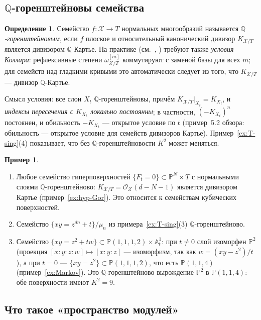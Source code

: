 \documentclass[11pt,a4paper]{article}
\theoremstyle{plain}
\theoremstyle{definition}
\newtheorem{definition}[theorem]{Определение}
\newtheorem{example}[theorem]{Пример}
\theoremstyle{remark}
\newcommand{\Q}{\mathbb{Q}}
\newcommand{\PP}{\mathbb{P}}
\newcommand{\A}{\mathbb{A}}
\newcommand{\cO}{\mathcal{O}}
\newcommand{\cX}{\mathcal{X}}
\begin{document}
\subsection{\texorpdfstring{$\Q$}{Q}-горенштейновы семейства}

\begin{definition}\label{def:QGor-family}
Семейство $f\colon\cX\to T$ нормальных многообразий называется \emph{$\Q$-горенштейновым}, если
$f$ плоское и относительный канонический дивизор $K_{\cX/T}$ является дивизором $\Q$-Картье. На практике
(см.~\cite[\S\,2.5]{Xu}, \cite{Kol23}) требуют также \emph{условия Коллара}: рефлексивные степени
$\omega_{\cX/T}^{[m]}$ коммутируют с заменой базы для всех $m$; для семейств над гладкими кривыми
это автоматически следует из того, что $K_{\cX/T}$ --- дивизор $\Q$-Картье.
\end{definition}

Смысл условия: все слои $X_t$ $\Q$-горенштейновы, причём $K_{\cX/T}|_{X_t}=K_{X_t}$, и
\emph{индексы пересечения с $K_{X_t}$ локально постоянны}; в частности, $(-K_{X_t})^n$ постоянен,
и обильность $-K_{X_t}$ --- открытое условие по $t$ (пример~5.2 обзора: обильность --- открытое
условие для семейств дивизоров Картье). Пример~\ref{ex:T-sing}(4) показывает, что без
$\Q$-горенштейновости $K^2$ может меняться.

\begin{example}
\begin{enumerate}
\item Любое семейство гиперповерхностей $\{F_t=0\}\subset\PP^N\times T$ с нормальными слоями
$\Q$-горенштейново: $K_{\cX/T}=\cO_\cX(d-N-1)$ является дивизором Картье (пример~\ref{ex:hyp-Gor}).
Это относится к семействам кубических поверхностей.
\item Семейство $\{xy=z^{dn}+t\}/\mu_n$ из примера~\ref{ex:T-sing}(3) $\Q$-горенштейново.
\item Семейство $\{xy=z^2+tw\}\subset\PP(1,1,1,2)\times\A^1_t$: при $t\ne0$ слой изоморфен $\PP^2$
(проекция $[x:y:z:w]\mapsto[x:y:z]$ --- изоморфизм, так как $w=(xy-z^2)/t$), а при $t=0$ ---
$\{xy=z^2\}\subset\PP(1,1,1,2)$, что есть $\PP(1,1,4)$ (пример~\ref{ex:Markov}). Это
$\Q$-горенштейново вырождение $\PP^2$ в $\PP(1,1,4)$: обе поверхности имеют $K^2=9$.
\end{enumerate}
\end{example}

\subsection{Что такое «пространство модулей»}\label{ss:moduli-def}
\end{document}
